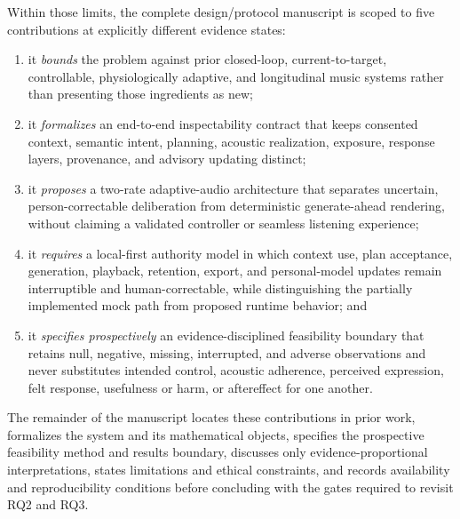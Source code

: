 Within those limits, the complete design/protocol manuscript is scoped to five
contributions at explicitly different evidence states:

\begin{enumerate}
  \item it \emph{bounds} the problem against prior closed-loop,
    current-to-target, controllable, physiologically adaptive, and longitudinal
    music systems rather than presenting those ingredients as new;
  \item it \emph{formalizes} an end-to-end inspectability contract that keeps
    consented context, semantic intent, planning, acoustic realization,
    exposure, response layers, provenance, and advisory updating distinct;
  \item it \emph{proposes} a two-rate adaptive-audio architecture that
    separates uncertain, person-correctable deliberation from deterministic
    generate-ahead rendering, without claiming a validated controller or
    seamless listening experience;
  \item it \emph{requires} a local-first authority model in which context use,
    plan acceptance, generation, playback, retention, export, and
    personal-model updates remain interruptible and human-correctable, while
    distinguishing the partially implemented mock path from proposed runtime
    behavior; and
  \item it \emph{specifies prospectively} an evidence-disciplined
    feasibility boundary that retains null, negative, missing, interrupted, and
    adverse observations and never substitutes intended control, acoustic
    adherence, perceived expression, felt response, usefulness or harm, or
    aftereffect for one another.
\end{enumerate}

The remainder of the manuscript locates these contributions in prior work,
formalizes the system and its mathematical objects, specifies the prospective
feasibility method and results boundary, discusses only evidence-proportional
interpretations, states limitations and ethical constraints, and records
availability and reproducibility conditions before concluding with the gates
required to revisit RQ2 and RQ3.
